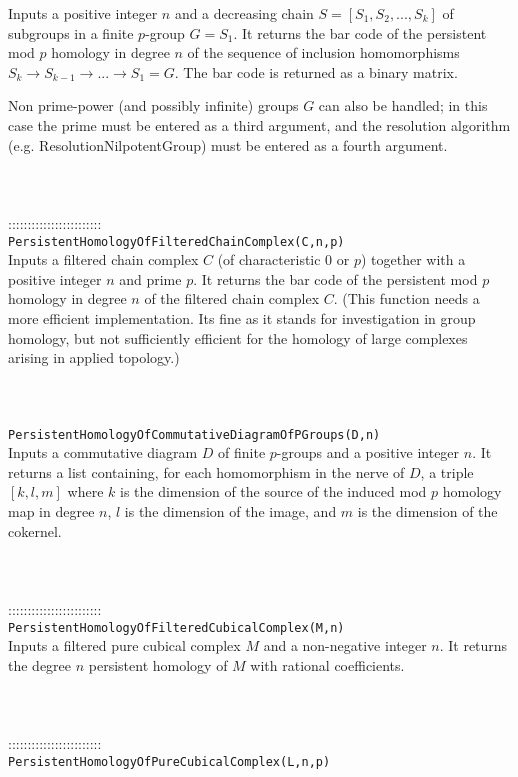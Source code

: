 \documentclass[a4paper,11pt]{report}
\begin{document}
{ Inputs a positive integer $n$ and a decreasing chain $S=[S_1, S_2, ..., S_k]$ of subgroups in a finite $p$-group $G=S_1$. It returns the bar code of the persistent mod $p$ homology in degree $n$ of the sequence of inclusion homomorphisms $S_k \rightarrow S_{k-1} \rightarrow ... \rightarrow S_1=G $. The bar code is returned as a binary matrix. 

 Non prime-power (and possibly infinite) groups $G$ can also be handled; in this case the prime must be entered as a third
argument, and the resolution algorithm (e.g. ResolutionNilpotentGroup) must be
entered as a fourth argument. \\
 \\
 \\
 \\
 ::::::::::::::::::::::::\\
 \texttt{PersistentHomologyOfFilteredChainComplex(C,n,p) }\\
 

 Inputs a filtered chain complex $C$ (of characteristic $0$ or $p$) together with a positive integer $n$ and prime $p$. It returns the bar code of the persistent mod $p$ homology in degree $n$ of the filtered chain complex $C$. (This function needs a more efficient implementation. Its fine as it stands
for investigation in group homology, but not sufficiently efficient for the
homology of large complexes arising in applied topology.) \\
 \\
 \\
 \\
 \texttt{PersistentHomologyOfCommutativeDiagramOfPGroups(D,n) }\\
 

 Inputs a commutative diagram $D$ of finite $p$-groups and a positive integer $n$. It returns a list containing, for each homomorphism in the nerve of $D$, a triple $[k,l,m]$ where $k$ is the dimension of the source of the induced mod $p$ homology map in degree $n$, $l$ is the dimension of the image, and $m$ is the dimension of the cokernel. \\
 \\
 \\
 \\
 ::::::::::::::::::::::::\\
 \texttt{PersistentHomologyOfFilteredCubicalComplex(M,n)}\\
 

 Inputs a filtered pure cubical complex $M$ and a non-negative integer $n$. It returns the degree $n$ persistent homology of $ M$ with rational coefficients. \\
 \\
 \\
 \\
 ::::::::::::::::::::::::\\
 \texttt{PersistentHomologyOfPureCubicalComplex(L,n,p)}\\
 

}
\end{document}
